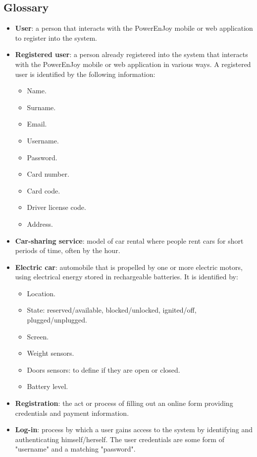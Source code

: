 \subsection{Glossary}
\begin{itemize}
	\item \textbf{User}: a person that interacts with the PowerEnJoy mobile or web application to register into the system.
	\item \textbf{Registered user}: a person already registered into the system that interacts with the PowerEnJoy mobile or web application in various ways. A registered user is identified by the following information:
	\begin{itemize}
		\item Name.
		\item Surname.
		\item Email.
		\item Username.
		\item Password.
		\item Card number.
		\item Card code.
		\item Driver license code.
		\item Address.
	\end{itemize}
	\item \textbf{Car-sharing service}: model of car rental where people rent cars for short periods of time, often by the hour.
	\item \textbf{Electric car}: automobile that is propelled by one or more electric motors, using electrical energy stored in rechargeable batteries. It is identified by:
	\begin{itemize}
		\item Location.
		\item State: reserved/available, blocked/unlocked, ignited/off, plugged/unplugged.
		\item Screen.
		\item Weight sensors.
		\item Doors sensors: to define if they are open or closed.
		\item Battery level. 
	\end{itemize}
	\item \textbf{Registration}: the act or process of filling out an online form providing credentials and payment information. 
	\item \textbf{Log-in}: process by which a user gains access to the system by identifying and authenticating himself/herself. The user credentials are some form of "username" and a matching "password".

\end{itemize}
